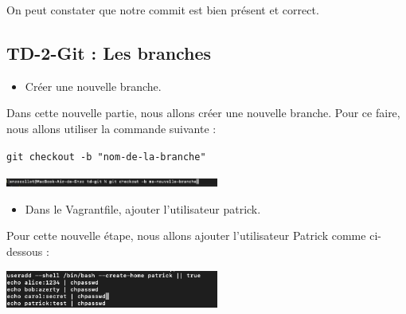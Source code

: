\documentclass[12pt]{article}
\begin{document}
\vspace{0.3cm}

On peut constater que notre commit est bien présent et correct.

\newpage

\subsection{TD-2-Git : Les branches}

\vspace{0.3cm}

\begin{itemize}
  \item Créer une nouvelle branche.
\end{itemize}

\vspace{0.3cm}

Dans cette nouvelle partie, nous allons créer une nouvelle branche. Pour ce faire, nous allons utiliser la commande suivante :

\texttt{git checkout -b "nom-de-la-branche"}

\vspace{0.3cm}

\begin{center}
  \includegraphics[width=7cm]{Image-TD-Git-2/git-checkout.png}
\end{center}

\vspace{0.3cm}

\begin{itemize}
  \item Dans le Vagrantfile, ajouter l'utilisateur patrick.
\end{itemize}

\vspace{0.3cm}

Pour cette nouvelle étape, nous allons ajouter l'utilisateur Patrick comme ci-dessous :

\vspace{0.3cm}

\begin{center}
  \includegraphics[width=7cm]{Image-TD-Git-2/ajout-patrick-vagrant.png}
\end{center}
\end{document}
